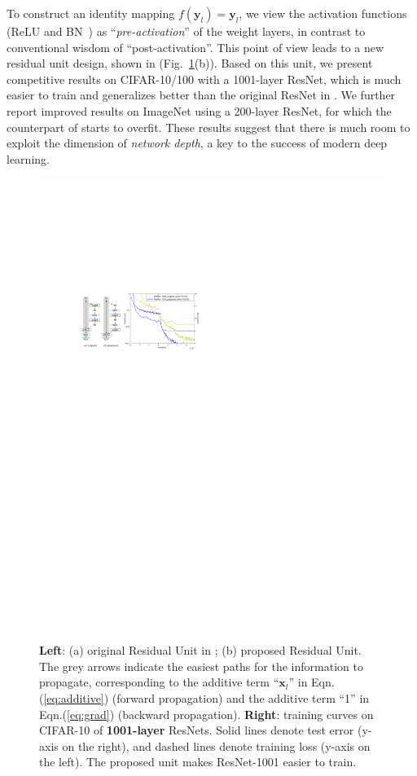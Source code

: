 \documentclass[runningheads]{llncs}
\newcommand{\ve}[1]{\mathbf{#1}} %
\begin{document}
To construct an identity mapping $f(\ve{y}_{l})=\ve{y}_{l}$, we view the activation functions (ReLU and BN~\cite{Ioffe2015}) as ``\emph{pre-activation}'' of the weight layers, in contrast to conventional wisdom of ``post-activation''. This point of view leads to a new residual unit design, shown in (Fig.~\ref{fig:teaser}(b)). Based on this unit, we present competitive results on CIFAR-10/100 with a 1001-layer ResNet, which is much easier to train and generalizes better than the original ResNet in \cite{He2016}. We further report improved results on ImageNet using a 200-layer ResNet, for which the counterpart of \cite{He2016} starts to overfit. These results suggest that there is much room to exploit the dimension of \emph{network depth}, a key to the success of modern deep learning.


\begin{figure}[t]
\centering
\includegraphics[width=1.0\linewidth]{eps/teaser}
\caption{\textbf{Left}: (a) original Residual Unit in \cite{He2016}; (b) proposed Residual Unit. The grey arrows indicate the easiest paths for the information to propagate, corresponding to the additive term ``$\ve{x}_l$'' in Eqn.(\ref{eq:additive}) (forward propagation) and the additive term ``1'' in Eqn.(\ref{eq:grad}) (backward propagation). \textbf{Right}: training curves on CIFAR-10 of \textbf{1001-layer} ResNets. Solid lines denote test error (y-axis on the right), and dashed lines denote training loss (y-axis on the left). The proposed unit makes ResNet-1001 easier to train.}
\label{fig:teaser}
\end{figure}
\end{document}
